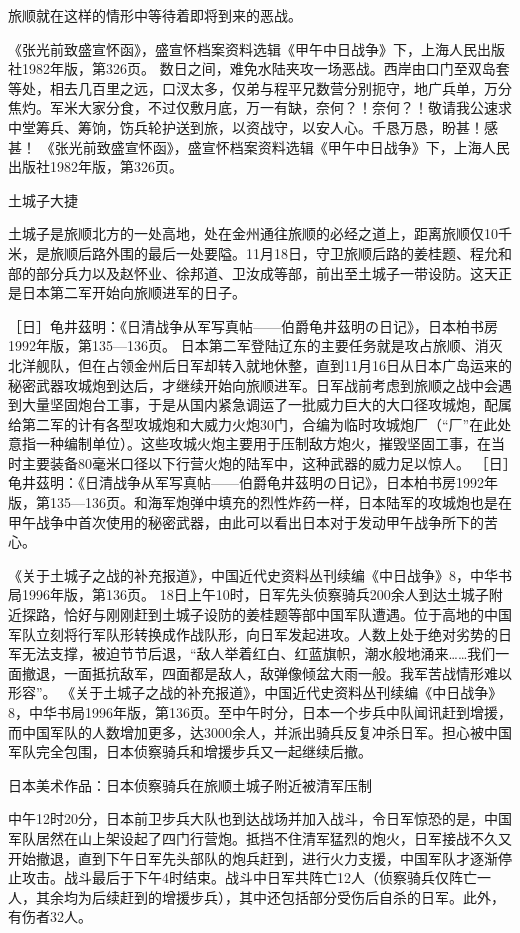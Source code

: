\documentclass[12pt,UTF8]{ctexbook}
\begin{document}
旅顺就在这样的情形中等待着即将到来的恶战。

《张光前致盛宣怀函》，盛宣怀档案资料选辑《甲午中日战争》下，上海人民出版社1982年版，第326页。
数日之间，难免水陆夹攻一场恶战。西岸由口门至双岛套等处，相去几百里之远，口汊太多，仅弟与程平兄数营分别扼守，地广兵单，万分焦灼。军米大家分食，不过仅敷月底，万一有缺，奈何？！奈何？！敬请我公速求中堂筹兵、筹饷，饬兵轮护送到旅，以资战守，以安人心。千恳万恳，盼甚！感甚！ 《张光前致盛宣怀函》，盛宣怀档案资料选辑《甲午中日战争》下，上海人民出版社1982年版，第326页。

土城子大捷

土城子是旅顺北方的一处高地，处在金州通往旅顺的必经之道上，距离旅顺仅10千米，是旅顺后路外围的最后一处要隘。11月18日，守卫旅顺后路的姜桂题、程允和部的部分兵力以及赵怀业、徐邦道、卫汝成等部，前出至土城子一带设防。这天正是日本第二军开始向旅顺进军的日子。

［日］龟井茲明：《日清战争从军写真帖——伯爵龟井茲明の日记》，日本柏书房1992年版，第135—136页。
日本第二军登陆辽东的主要任务就是攻占旅顺、消灭北洋舰队，但在占领金州后日军却转入就地休整，直到11月16日从日本广岛运来的秘密武器攻城炮到达后，才继续开始向旅顺进军。日军战前考虑到旅顺之战中会遇到大量坚固炮台工事，于是从国内紧急调运了一批威力巨大的大口径攻城炮，配属给第二军的计有各型攻城炮和大威力火炮30门，合编为临时攻城炮厂（“厂”在此处意指一种编制单位）。这些攻城火炮主要用于压制敌方炮火，摧毁坚固工事，在当时主要装备80毫米口径以下行营火炮的陆军中，这种武器的威力足以惊人。 ［日］龟井茲明：《日清战争从军写真帖——伯爵龟井茲明の日记》，日本柏书房1992年版，第135—136页。和海军炮弹中填充的烈性炸药一样，日本陆军的攻城炮也是在甲午战争中首次使用的秘密武器，由此可以看出日本对于发动甲午战争所下的苦心。

《关于土城子之战的补充报道》，中国近代史资料丛刊续编《中日战争》8，中华书局1996年版，第136页。
18日上午10时，日军先头侦察骑兵200余人到达土城子附近探路，恰好与刚刚赶到土城子设防的姜桂题等部中国军队遭遇。位于高地的中国军队立刻将行军队形转换成作战队形，向日军发起进攻。人数上处于绝对劣势的日军无法支撑，被迫节节后退，“敌人举着红白、红蓝旗帜，潮水般地涌来……我们一面撤退，一面抵抗敌军，四面都是敌人，敌弹像倾盆大雨一般。我军苦战情形难以形容”。 《关于土城子之战的补充报道》，中国近代史资料丛刊续编《中日战争》8，中华书局1996年版，第136页。至中午时分，日本一个步兵中队闻讯赶到增援，而中国军队的人数增加更多，达3000余人，并派出骑兵反复冲杀日军。担心被中国军队完全包围，日本侦察骑兵和增援步兵又一起继续后撤。


日本美术作品：日本侦察骑兵在旅顺土城子附近被清军压制

中午12时20分，日本前卫步兵大队也到达战场并加入战斗，令日军惊恐的是，中国军队居然在山上架设起了四门行营炮。抵挡不住清军猛烈的炮火，日军接战不久又开始撤退，直到下午日军先头部队的炮兵赶到，进行火力支援，中国军队才逐渐停止攻击。战斗最后于下午4时结束。战斗中日军共阵亡12人（侦察骑兵仅阵亡一人，其余均为后续赶到的增援步兵），其中还包括部分受伤后自杀的日军。此外，有伤者32人。
\end{document}
